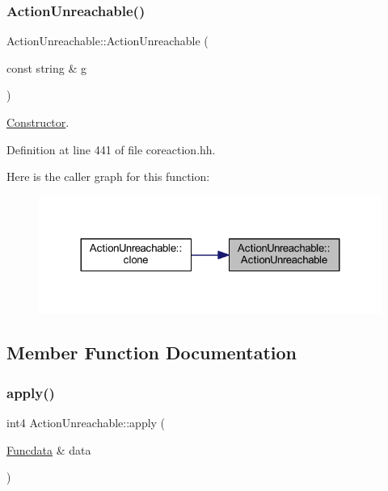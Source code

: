 \subsubsection{\texorpdfstring{ActionUnreachable()}{ActionUnreachable()}}
{\footnotesize\ttfamily Action\+Unreachable\+::\+Action\+Unreachable (\begin{DoxyParamCaption}\item[{const string \&}]{g }\end{DoxyParamCaption})\hspace{0.3cm}{\ttfamily [inline]}}



\mbox{\hyperlink{class_constructor}{Constructor}}. 



Definition at line 441 of file coreaction.\+hh.

Here is the caller graph for this function\+:
\nopagebreak
\begin{figure}[H]
\begin{center}
\leavevmode
\includegraphics[width=324pt]{class_action_unreachable_a57b01cb2a918a97c77977cb76fa7c745_icgraph}
\end{center}
\end{figure}


\subsection{Member Function Documentation}
\mbox{\label{class_action_unreachable_a9dd250eba93553aad31aa38168d7c301}} 
\subsubsection{\texorpdfstring{apply()}{apply()}}
{\footnotesize\ttfamily int4 Action\+Unreachable\+::apply (\begin{DoxyParamCaption}\item[{\mbox{\hyperlink{class_funcdata}{Funcdata}} \&}]{data }\end{DoxyParamCaption})\hspace{0.3cm}{\ttfamily [virtual]}}



